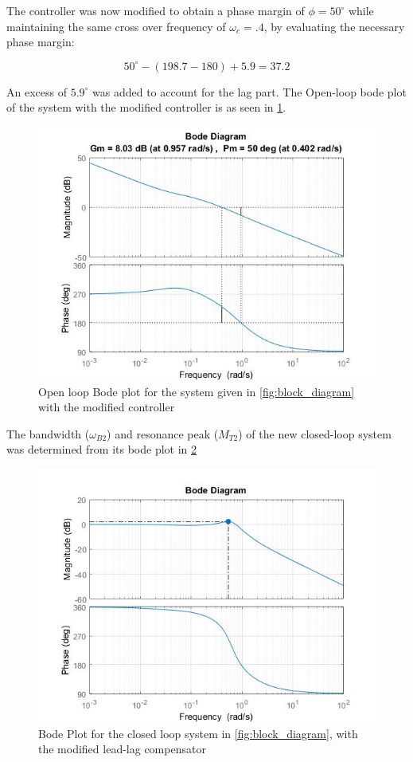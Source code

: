 \documentclass[a4paper]{article}
\begin{document}
The controller was now modified to obtain a phase margin of $\phi=50^\circ$ while maintaining the same cross over frequency of $\omega_c=.4$, by evaluating the necessary phase margin: 

\[50^\circ-(198.7-180)+5.9 = 37.2 \]

An excess of $5.9^\circ$ was added to account for the lag part. The Open-loop bode plot of the system with the modified controller is as seen in \cref{fig:bode_openloop_ph50}.

\begin{figure}[!ht]
\centering
\includegraphics[width=.8\linewidth]{bode_openloop_ph50_n}
\caption{Open loop Bode plot for the system given in \cref{fig:block_diagram} with the modified controller}
\label{fig:bode_openloop_ph50}
\end{figure}

The bandwidth ($\omega_{B2}$) and resonance peak ($M_{T2}$) of the new closed-loop system was determined from its bode plot in \cref{fig:bode_closedloop_ph50}

\begin{figure}[!ht]
\centering
\includegraphics[width=.8\linewidth]{bode_closedloop_ph50}
\caption{Bode Plot for the closed loop system in \cref{fig:block_diagram}, with the modified lead-lag compensator}
\label{fig:bode_closedloop_ph50}
\end{figure}
\end{document}
